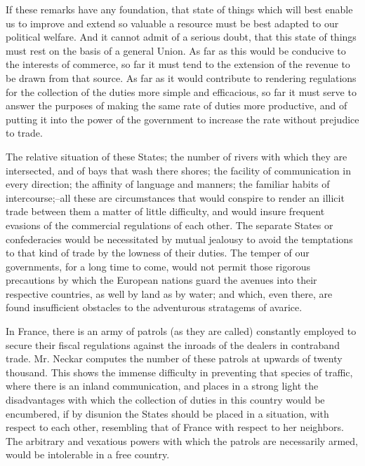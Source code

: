 If these remarks have any foundation, that state of things which will best enable us to improve and extend so valuable a resource must be best adapted to our political welfare. And it cannot admit of a serious doubt, that this state of things must rest on the basis of a general Union. As far as this would be conducive to the interests of commerce, so far it must tend to the extension of the revenue to be drawn from that source. As far as it would contribute to rendering regulations for the collection of the duties more simple and efficacious, so far it must serve to answer the purposes of making the same rate of duties more productive, and of putting it into the power of the government to increase the rate without prejudice to trade.

The relative situation of these States; the number of rivers with which they are intersected, and of bays that wash there shores; the facility of communication in every direction; the affinity of language and manners; the familiar habits of intercourse;--all these are circumstances that would conspire to render an illicit trade between them a matter of little difficulty, and would insure frequent evasions of the commercial regulations of each other. The separate States or confederacies would be necessitated by mutual jealousy to avoid the temptations to that kind of trade by the lowness of their duties. The temper of our governments, for a long time to come, would not permit those rigorous precautions by which the European nations guard the avenues into their respective countries, as well by land as by water; and which, even there, are found insufficient obstacles to the adventurous stratagems of avarice.

In France, there is an army of patrols (as they are called) constantly employed to secure their fiscal regulations against the inroads of the dealers in contraband trade. Mr. Neckar computes the number of these patrols at upwards of twenty thousand. This shows the immense difficulty in preventing that species of traffic, where there is an inland communication, and places in a strong light the disadvantages with which the collection of duties in this country would be encumbered, if by disunion the States should be placed in a situation, with respect to each other, resembling that of France with respect to her neighbors. The arbitrary and vexatious powers with which the patrols are necessarily armed, would be intolerable in a free country.


